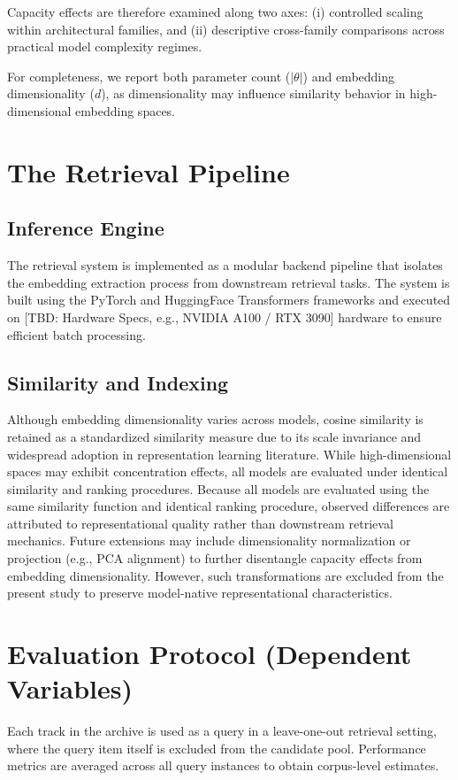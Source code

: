 Capacity effects are therefore examined along two axes:
(i) controlled scaling within architectural families, and
(ii) descriptive cross-family comparisons across practical model complexity regimes.


For completeness, we report both parameter count ($|\theta|$) 
and embedding dimensionality ($d$), as dimensionality may influence 
similarity behavior in high-dimensional embedding spaces.



\section{The Retrieval Pipeline}

\subsection{Inference Engine}
The retrieval system is implemented as a modular backend pipeline that isolates the embedding extraction process from downstream retrieval tasks. The system is built using the PyTorch and HuggingFace Transformers frameworks and executed on [TBD: Hardware Specs, e.g., NVIDIA A100 / RTX 3090] hardware to ensure efficient batch processing.

\subsection{Similarity and Indexing}
Although embedding dimensionality varies across models, cosine similarity is retained as a standardized similarity measure due to its scale invariance and widespread adoption in representation learning literature. 
While high-dimensional spaces may exhibit concentration effects, all models are evaluated under identical similarity and ranking procedures. 
Because all models are evaluated using the same similarity function and identical ranking procedure, observed differences are attributed to representational quality rather than downstream retrieval mechanics.
Future extensions may include dimensionality normalization or projection (e.g., PCA alignment) to further disentangle capacity effects from embedding dimensionality. However, such transformations are excluded from the present study to preserve model-native representational characteristics.



\section{Evaluation Protocol (Dependent Variables)}
Each track in the archive is used as a query in a leave-one-out retrieval setting, where the query item itself is excluded from the candidate pool.
Performance metrics are averaged across all query instances to obtain corpus-level estimates.

